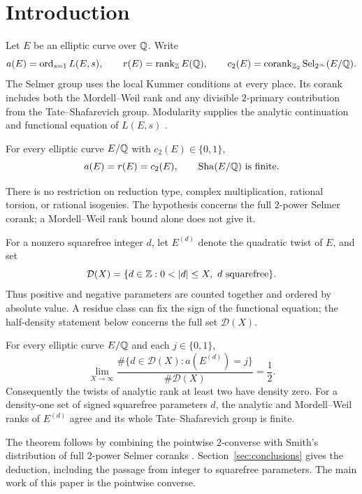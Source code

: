 \section{Introduction}\label{sec:introduction}

Let $E$ be an elliptic curve over $\mathbb Q$. Write
\[
 a(E)=\operatorname{ord}_{s=1}L(E,s),\qquad r(E)=\operatorname{rank}_{\mathbb Z}E(\mathbb Q),\qquad
 c_2(E)=\operatorname{corank}_{\mathbb Z_2}\operatorname{Sel}_{2^\infty}(E/\mathbb Q).
\]
The Selmer group uses the local Kummer conditions at every place.
Its corank includes both the Mordell--Weil rank and any divisible
$2$-primary contribution from the Tate--Shafarevich group.
Modularity supplies the analytic continuation and functional equation
of $L(E,s)$ \citep{BreuilConradDiamondTaylor2001}.

\begin{theorem}\label{thm:main-converse}
For every elliptic curve $E/\mathbb Q$ with $c_2(E)\in\{0,1\}$,
\[
 a(E)=r(E)=c_2(E),\qquad \operatorname{Sha}(E/\mathbb Q)\text{ is finite}.
\]
\end{theorem}

There is no restriction on reduction type, complex multiplication,
rational torsion, or rational isogenies. The hypothesis concerns the full
$2$-power Selmer corank; a Mordell--Weil rank bound alone does not give it.

For a nonzero squarefree integer $d$, let $E^{(d)}$ denote the quadratic
twist of $E$, and set
\[
 \mathcal D(X)=\{d\in\Z:0<|d|\le X,\ d\text{ squarefree}\}.
\]
Thus positive and negative parameters are counted together and ordered
by absolute value. A residue class can fix the sign of the functional
equation; the half-density statement below concerns the full set
$\mathcal D(X)$.

\begin{theorem}\label{thm:main-density}
For every elliptic curve $E/\mathbb Q$ and each $j\in\{0,1\}$,
\[
 \lim_{X\to\infty}
 \frac{\#\{d\in\mathcal D(X):a(E^{(d)})=j\}}{\#\mathcal D(X)}
 =\frac12.
\]
Consequently the twists of analytic rank at least two have density zero.
For a density-one set of signed squarefree parameters $d$, the analytic
and Mordell--Weil ranks of $E^{(d)}$ agree and its whole
Tate--Shafarevich group is finite.
\end{theorem}

The theorem follows by combining the pointwise $2$-converse with
Smith's distribution of full $2$-power Selmer coranks
\citep[Theorem~1.1]{Smith2025}. Section~\ref{sec:conclusions} gives
the deduction, including the passage from integer to squarefree
parameters. The main work of this paper is the pointwise converse.

